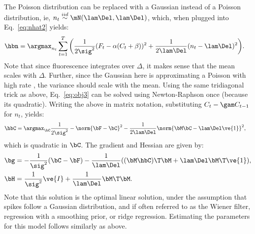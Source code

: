 The Poisson distribution can be replaced with a Gaussian instead of a Poisson distribution, ie,  $n_t \overset{iid}{\sim} \mN(\lam \Del, \lam \Del)$, which, when plugged into Eq.~\eqref{eq:nhat2} yields:
\begin{align} \label{eq:obj3}
\hbn &= \argmax_{n_t}  \sum_{t=1}^T \bigg( \frac{1}{2 \sig^2}(F_t - \alpha(C_t + \beta))^2  + 
 \frac{1}{2 \lam \Del}(n_t - \lam \Del)^2\bigg).
\end{align}
Note that since fluorescence integrates over $\Delta$, it makes sense that the mean scales with $\Delta$.  Further, since the Gaussian here is approximating a Poisson with high rate \cite{SjulsonMiesenbock07}, the variance should scale with the mean.  Using the same tridiagonal trick as above, Eq.~\eqref{eq:obj3} can be solved using Newton-Raphson once (because its quadratic).  Writing the above in matrix notation, substituting $C_t - \gam C_{t-1}$ for $n_t$, yields:
\begin{align}   \label{eq:w2}
\hbC&= \argmax_{\bC} \frac{1}{2\sig^2} -\norm{\bF - \bC}^2 - \frac{1}{2\lam\Del} \norm{\bM \bC - \lam\Del\ve{1}}^2,
\end{align}
\noindent which is quadratic in $\bC$.  The gradient and Hessian are given by:
\begin{align}
\bg &= -\frac{1}{\sig^2} (\bC - \bF) - \frac{1}{\lam\Del} ( (\bM \hbC)\T \bM + \lam\Del \bM\T \ve{1}), \\
\bH &= \frac{1}{\sig^2} \ve{I} + \frac{1}{\lam\Del} \bM\T \bM.
\end{align}
Note that this solution is the optimal linear solution, under the assumption that spikes follow a Gaussian distribution, and if often referred to as the Wiener filter, regression with a smoothing prior, or ridge regression.  Estimating the parameters for this model follows similarly as above. 